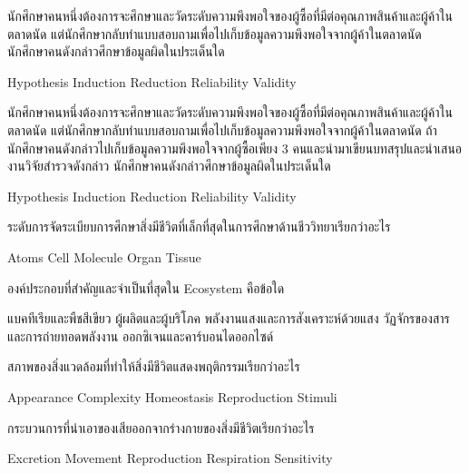 \documentclass[12pt, a4paper]{exam}
\begin{document}
\begin{questions}
\filbreak
  \question นักศึกษาคนหนึ่งต้องการจะศึกษาและวัดระดับความพึงพอใจของผู้ซื้อที่มีต่อคุณภาพสินค้าและผู้ค้าในตลาดนัด แต่นักศึกษากลับทำแบบสอบถามเพื่อไปเก็บข้อมูลความพึงพอใจจากผู้ค้าในตลาดนัด นักศึกษาคนดังกล่าวศึกษาข้อมูลผิดในประเด็นใด
  \begin{choices}
    \choice Hypothesis
    \choice Induction
    \choice Reduction
    \choice Reliability
    \choice Validity
\end{choices}

\filbreak
  \question นักศึกษาคนหนึ่งต้องการจะศึกษาและวัดระดับความพึงพอใจของผู้ซื้อที่มีต่อคุณภาพสินค้าและผู้ค้าในตลาดนัด แต่นักศึกษากลับทำแบบสอบถามเพื่อไปเก็บข้อมูลความพึงพอใจจากผู้ค้าในตลาดนัด ถ้านักศึกษาคนดังกล่าวไปเก็บข้อมูลความพึงพอใจจากผู้ซื้อเพียง 3 คนและนำมาเขียนบทสรุปและนำเสนอ งานวิจัยสำรวจดังกล่าว นักศึกษาคนดังกล่าวศึกษาข้อมูลผิดในประเด็นใด
  \begin{choices}
    \choice Hypothesis
    \choice Induction
    \choice Reduction
    \choice Reliability
    \choice Validity
\end{choices}

\filbreak
  \question ระดับการจัดระเบียบการศึกษาสิ่งมีชีวิตที่เล็กที่สุดในการศึกษาด้านชีววิทยาเรียกว่าอะไร
  \begin{choices}
    \choice Atoms
    \choice Cell
    \choice Molecule
    \choice Organ
    \choice Tissue
\end{choices}

\filbreak
  \question องค์ประกอบที่สำคัญและจำเป็นที่สุดใน Ecosystem คือข้อใด
  \begin{choices}
    \choice แบคทีเรียและพืชสีเขียว
    \choice ผู้ผลิตและผู้บริโภค
    \choice พลังงานแสงและการสังเคราะห์ด้วยแสง
    \choice วัฏจักรของสารและการถ่ายทอดพลังงาน
    \choice ออกซิเจนและคาร์บอนไดออกไซด์
\end{choices}

\filbreak
  \question สภาพของสิ่งแวดล้อมที่ทำให้สิ่งมีชีวิตแสดงพฤติกรรมเรียกว่าอะไร
  \begin{choices}
    \choice Appearance
    \choice Complexity
    \choice Homeostasis
    \choice Reproduction
    \choice Stimuli
\end{choices}

\filbreak
  \question กระบวนการที่นำเอาของเสียออกจากร่างกายของสิ่งมีชีวิตเรียกว่าอะไร
  \begin{choices}
    \choice Excretion
    \choice Movement
    \choice Reproduction
    \choice Respiration
    \choice Sensitivity
\end{choices}


\end{questions}
\end{document}
